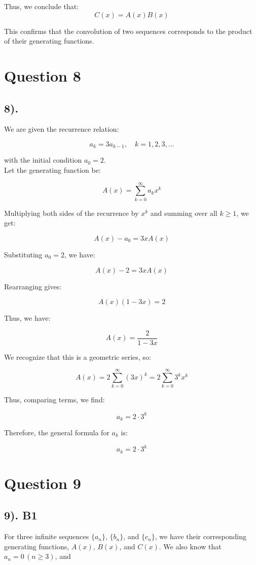 \documentclass[12pt]{article}
\begin{document}
Thus, we conclude that:
\[
C(x) = A(x) B(x)
\]

This confirms that the convolution of two sequences corresponds to the product of their generating functions.

\section*{Question 8}
\subsection*{8).}

We are given the recurrence relation:

\[
a_k = 3a_{k-1}, \quad k = 1,2,3,\dots
\]

with the initial condition \( a_0 = 2 \).\\

Let the generating function be:

\[
A(x) = \sum_{k=0}^{\infty} a_k x^k
\]

Multiplying both sides of the recurrence by \( x^k \) and summing over all \( k \geq 1 \), we get:

\[
A(x) - a_0 = 3x A(x)
\]

Substituting \( a_0 = 2 \), we have:

\[
A(x) - 2 = 3x A(x)
\]

Rearranging gives:

\[
A(x)(1 - 3x) = 2
\]

Thus, we have:

\[
A(x) = \frac{2}{1 - 3x}
\]

We recognize that this is a geometric series, so:

\[
A(x) = 2 \sum_{k=0}^{\infty} (3x)^k = 2 \sum_{k=0}^{\infty} 3^k x^k
\]

Thus, comparing terms, we find:

\[
a_k = 2 \cdot 3^k
\]

Therefore, the general formula for \( a_k \) is:

\[
a_k = 2 \cdot 3^k
\]

\section*{Question 9}
\subsection*{9). B1}

For three infinite sequences \(\{a_n\}\), \(\{b_n\}\), and \(\{c_n\}\), we have their corresponding generating functions, \(A(x)\), \(B(x)\), and \(C(x)\). We also know that \(a_n = 0 \, (n \geq 3)\), and
\end{document}
